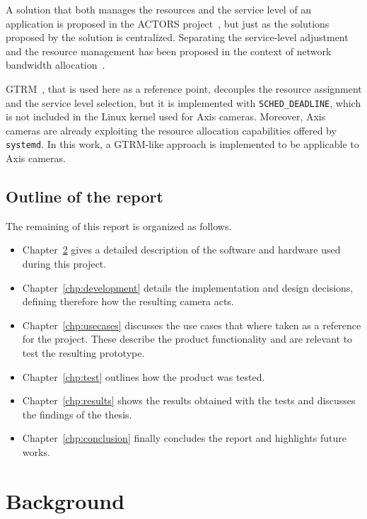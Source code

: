 \documentclass[nobiblatex]{LTHthesis}
\begin{document}
A solution that both manages the resources and the service level of an 
application is proposed in the ACTORS project~\cite{Bin11}, but just as the 
solutions proposed by \cite{Raj97a,Soj11,Arz11} the solution is centralized. 
Separating the service-level adjustment and the resource management has been proposed in the context of network bandwidth allocation~\cite{Sil11}.

GTRM~\cite{gtrm}, that is used here as a reference point, decouples the
resource assignment and the service level selection, but it is implemented
with \texttt{SCHED\_DEADLINE}, which is not included in the Linux kernel
used for Axis cameras. Moreover, Axis cameras are already exploiting the
resource allocation capabilities offered by \texttt{systemd}. In this
work, a GTRM-like approach is implemented to be applicable to Axis cameras.

\section{Outline of the report}

The remaining of this report is organized as follows.

\begin{itemize}
\item Chapter~\ref{chp:background} gives a detailed description of
  the software and hardware used during this project.
\item Chapter~\ref{chp:development} details the implementation and design
  decisions, defining therefore how the resulting camera acts.
\item Chapter~\ref{chp:usecases} discusses the use cases that where
  taken as a reference for the project. These describe the product
  functionality and are relevant to test the resulting prototype.
\item Chapter~\ref{chp:test} outlines how the product was tested.
\item Chapter~\ref{chp:results} shows the results obtained with the
  tests and discusses the findings of the thesis.
\item Chapter~\ref{chp:conclusion} finally concludes the report and
  highlights future works.
\end{itemize}



\chapter{Background}
\label{chp:background}
\end{document}
